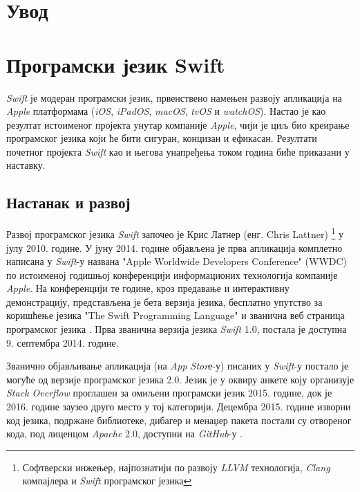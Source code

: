 \documentclass[12pt,oneside]{memoir}
\begin{document}
\frontmatter
\naslovna
\komisija
\apstrakt
\tableofcontents*

\mainmatter

\chapter{Увод}

\chapter{Програмски језик Swift}

\indent \textit{Swift} је модеран програмски језик, првенствено намењен развоју  апликациjа на \textit{Apple} платформама (\textit{iOS}, \textit{iPadOS}, \textit{macOS}, \textit{tvOS} и \textit{watchOS}). Настао је као резултат истоименог пројекта унутар компаније \textit{Apple}, чији је циљ био креирање програмског језика  који ће бити сигуран, концизан и ефикасан. Резултати почетног пројекта \textit{Swift} као и његова унапређења током година биће приказани у наставку. 

\section{Настанак и развој}

\indent Развој програмског језика \textit{Swift} започео је Крис Латнер (енг. Chris Lattner) \footnote{Софтверски инжењер, најпознатији по развоју \textit{LLVM}  технологија, \textit{Clang} компајлера и \textit{Swift} програмског језика} у јулу 2010. године. У јуну 2014. године објављена је прва апликација комплетно написана у \textit{Swift}-у названа "Apple Worldwide Developers Conference" (WWDC) по истоименој годишњој конференцији информационих технологија компаније \textit{Apple}. На конференцији те године, кроз предавање и интерактивну демонстрацију, представљена је бета верзија језика, бесплатно упутство за коришћење језика "The Swift Programming Language" \cite{The_Swift_Programming_Language} и званична веб страница програмског језика \cite{SwiftOfficialSite}. Прва званична верзија језика \textit{Swift} 1.0, постала је доступна 9. септембра 2014. године.

\indent Званично објављивање апликација (на \textit{App Storе}-у) писаних у \textit{Swift}-у постало је могуће од верзије програмског језика 2.0. Језик је у оквиру анкете коју организује  \textit{Stack Overflow}  \cite{StackOverflow} проглашен за омиљени програмски језик 2015. године, док је 2016. године заузео друго место у тој категорији. Децембра 2015. године изворни код језика, подржане библиотеке, дибагер и менаџер пакета постали су отвореног кода, под лиценцом \textit{Apache} 2.0, доступни на \textit{GitHub}-у \cite{GitHub_Swift}.
\end{document}
